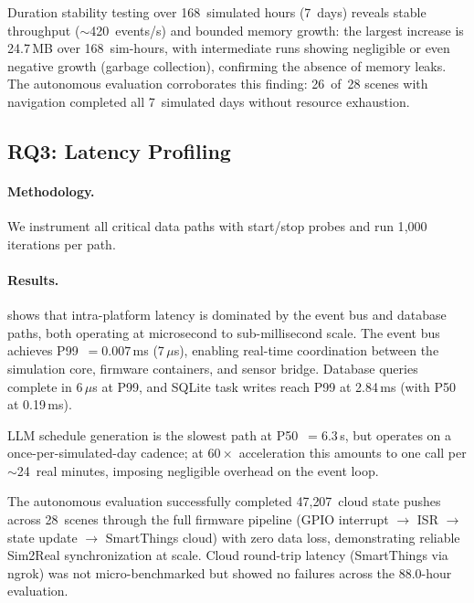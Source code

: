 Duration stability testing over 168~simulated hours (7~days)
reveals stable throughput ($\sim$420~events/s) and bounded memory
growth: the largest increase is 24.7\,MB over 168~sim-hours,
with intermediate runs showing negligible or even negative growth
(garbage collection), confirming the absence of memory leaks.
The autonomous evaluation corroborates this finding: 26~of~28
scenes with navigation completed all 7~simulated days without
resource exhaustion.

\subsection{RQ3: Latency Profiling}\label{sec:eval-rq3}

\paragraph{Methodology.}
We instrument all critical data paths with start/stop probes and
run 1{,}000 iterations per path.

\paragraph{Results.}





 shows that intra-platform latency is
dominated by the event bus and database paths, both operating at
microsecond to sub-millisecond scale.  The event bus achieves
P99~$= 0.007$\,ms (7\,$\mu$s), enabling real-time coordination
between the simulation core, firmware containers, and sensor bridge.
Database queries complete in 6\,$\mu$s at P99, and SQLite
task writes reach P99 at 2.84\,ms (with P50 at 0.19\,ms).

LLM schedule generation is the slowest path at P50~$= 6.3$\,s, but
operates on a once-per-simulated-day cadence; at $60\times$
acceleration this amounts to one call per $\sim$24~real minutes,
imposing negligible overhead on the event loop.

The autonomous evaluation successfully completed 47{,}207~cloud state
pushes across 28~scenes through the full firmware pipeline
(GPIO interrupt $\to$ ISR $\to$ state update $\to$ SmartThings cloud)
with zero data loss, demonstrating reliable Sim2Real synchronization
at scale.  Cloud round-trip latency (SmartThings via ngrok) was not
micro-benchmarked but showed no failures across the 88.0-hour
evaluation.

